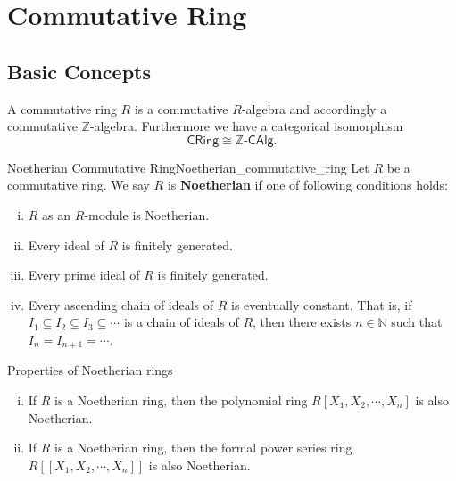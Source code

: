 \chapter{Commutative Ring}
\section{Basic Concepts}
A commutative ring $R$ is a commutative $R$-algebra and accordingly a commutative $\mathbb{Z}$-algebra. Furthermore we have a categorical isomorphism 
\[
    \mathsf{CRing}\cong \mathbb{Z}\text{-}\mathsf{CAlg}.
\]



\begin{definition}{Noetherian Commutative Ring}{Noetherian_commutative_ring}
    Let $R$ be a commutative ring. We say $R$ is \textbf{Noetherian} if one of following conditions holds:
    \begin{enumerate}[(i)]
        \item $R$ as an $R$-module is Noetherian.
        \item Every ideal of $R$ is finitely generated.
        \item Every prime ideal of $R$ is finitely generated.
        \item Every ascending chain of ideals of $R$ is eventually constant. That is, if $I_1\subseteq I_2\subseteq I_3\subseteq\cdots$ is a chain of ideals of $R$, then there exists $n\in\mathbb{N}$ such that $I_n=I_{n+1}=\cdots$.
    \end{enumerate}
\end{definition}

\begin{proposition}{Properties of Noetherian rings}{}
    \begin{enumerate}[(i)]
        \item If $R$ is a Noetherian ring, then the polynomial ring $R[X_1,X_2,\cdots,X_n]$ is also Noetherian.
        \item If $R$ is a Noetherian ring, then the  formal power series ring $R[[X_1,X_2,\cdots,X_n]]$ is also Noetherian.
    \end{enumerate}
\end{proposition}

